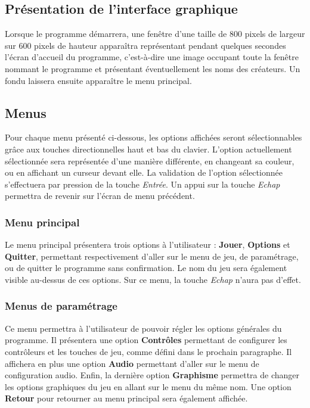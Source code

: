 \subsection{Présentation de l'interface graphique}

Lorsque le programme démarrera, une fenêtre d'une taille de 800 pixels de largeur sur 600 pixels de hauteur apparaîtra représentant pendant quelques secondes l'écran d'accueil du programme, c'est-à-dire une image occupant toute la fenêtre nommant le programme et présentant éventuellement les noms des créateurs. Un fondu laissera ensuite apparaître le menu principal.

\subsection{Menus}

Pour chaque menu présenté ci-dessous, les options affichées seront sélectionnables grâce aux touches directionnelles haut et bas du clavier. L'option  actuellement sélectionnée sera représentée d'une manière différente, en changeant sa couleur, ou en affichant un curseur devant elle. La validation de l'option sélectionnée s'effectuera par pression de la touche \textit{Entrée}. Un appui sur la touche \textit{Echap} permettra de revenir sur l'écran de menu précédent.

\subsubsection{Menu principal}

Le menu principal présentera trois options à l'utilisateur : \textbf{Jouer}, \textbf{Options} et \textbf{Quitter}, permettant respectivement d'aller sur le menu de jeu, de paramétrage, ou de quitter le programme sans confirmation. Le nom du jeu sera également visible au-dessus de ces options. Sur ce menu, la touche \textit{Echap} n'aura pas d'effet.

\subsubsection{Menus de paramétrage}

Ce menu permettra à l'utilisateur de pouvoir régler les options générales du programme. Il présentera une option \textbf{Contrôles} permettant de configurer les contrôleurs et les touches de jeu, comme défini dans le prochain paragraphe. Il affichera en plus une option \textbf{Audio} permettant d'aller sur le menu de configuration audio. Enfin, la dernière option \textbf{Graphisme} permettra de changer les options graphiques du jeu en allant sur le menu du même nom. Une option \textbf{Retour} pour retourner au menu principal sera également affichée.\\

